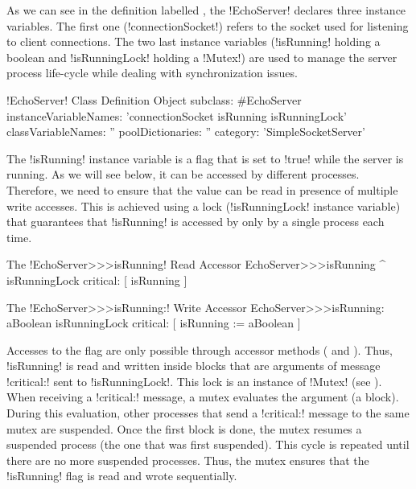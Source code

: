 \documentclass[a4paper,10pt,twoside]{book}
\begin{document}
As we can see in the definition labelled , the \ct!EchoServer! declares three instance variables.
The first one (\ct!connectionSocket!) refers to the socket used for listening to client connections.
The two last instance variables (\ct!isRunning! holding a boolean and \ct!isRunningLock! holding a \ct!Mutex!) are used to manage the server process life-cycle while dealing with synchronization issues. 
 
\begin{classdef}[echoServerClassDef]{\ct!EchoServer! Class Definition}
Object subclass: #EchoServer
	instanceVariableNames: 'connectionSocket isRunning isRunningLock'
	classVariableNames: ''
	poolDictionaries: ''
	category: 'SimpleSocketServer'
\end{classdef}


The \ct!isRunning! instance variable is a flag that is set to \ct!true! while the server is running.
As we will see below, it can be accessed by different processes.
Therefore, we need to ensure that the value can be read in presence of multiple write accesses.
This is achieved using a lock (\ct!isRunningLock! instance variable) that guarantees that \ct!isRunning! is accessed by only by a single process each time.

\begin{method}{The \ct!EchoServer>>>isRunning! Read Accessor}
EchoServer>>>isRunning
	^ isRunningLock critical: [ isRunning ]
\end{method}

\begin{method}{The \ct!EchoServer>>>isRunning:! Write Accessor}
EchoServer>>>isRunning: aBoolean
	isRunningLock critical: [ isRunning := aBoolean ]
\end{method}

Accesses to the flag are only possible through accessor methods ( and ).
Thus, \ct!isRunning! is read and written inside blocks that are arguments of message \ct!critical:! sent to \ct!isRunningLock!.
This lock is an instance of \ct!Mutex! (see ).
When receiving a \ct!critical:! message, a mutex evaluates the argument (a block).
During this evaluation, other processes that send a \ct!critical:! message to the same mutex are suspended.
Once the first block is done, the mutex resumes a suspended process (the one that was first suspended).
This cycle is repeated until there are no more suspended processes.
Thus, the mutex ensures that the \ct!isRunning! flag is read and wrote sequentially.
\end{document}
